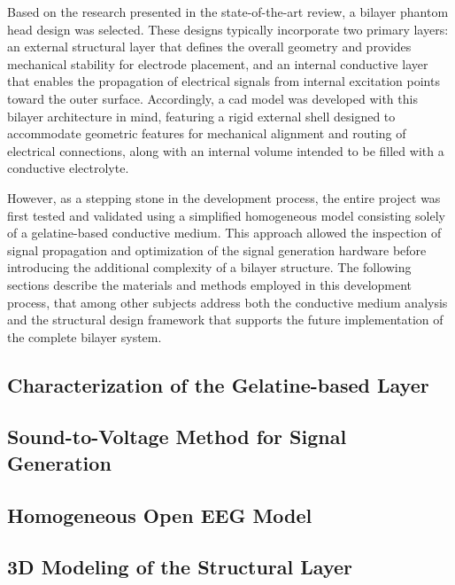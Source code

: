 \documentclass[../../00_Main/Main.tex]{subfiles}
\begin{document}
Based on the research presented in the state-of-the-art review, a bilayer phantom head design was selected. These designs typically incorporate two primary layers: an external structural layer that defines the overall geometry and provides mechanical stability for electrode placement, and an internal conductive layer that enables the propagation of electrical signals from internal excitation points toward the outer surface. Accordingly, a \gls{cad} model was developed with this bilayer architecture in mind, featuring a rigid external shell designed to accommodate geometric features for mechanical alignment and routing of electrical connections, along with an internal volume intended to be filled with a conductive electrolyte.

However, as a stepping stone in the development process, the entire project was first tested and validated using a simplified homogeneous model consisting solely of a gelatine-based conductive medium. This approach allowed the inspection of signal propagation and optimization of the signal generation hardware before introducing the additional complexity of a bilayer structure. The following sections describe the materials and methods employed in this development process, that among other subjects address both the conductive medium analysis and the structural design framework that supports the future implementation of the complete bilayer system.

\subsection{Characterization of the Gelatine-based Layer}
\label{subsec:gelatine_layer}


\subsection{Sound-to-Voltage Method for Signal Generation}
\label{subsec:hardware_transduction}


\subsection{Homogeneous Open EEG Model}
\label{subsec:open_eeg_phantom}


\subsection{3D Modeling of the Structural Layer}
\label{subsec:phantom_head_modeling}

\end{document}
